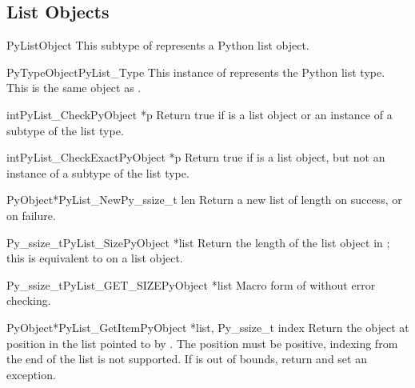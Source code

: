 \subsection{List Objects \label{listObjects}}

\begin{ctypedesc}{PyListObject}
  This subtype of  represents a Python list object.
\end{ctypedesc}

\begin{cvardesc}{PyTypeObject}{PyList_Type}
  This instance of  represents the Python list
  type.  This is the same object as .
\end{cvardesc}

\begin{cfuncdesc}{int}{PyList_Check}{PyObject *p}
  Return true if  is a list object or an instance of a
  subtype of the list type.
\end{cfuncdesc}

\begin{cfuncdesc}{int}{PyList_CheckExact}{PyObject *p}
  Return true if  is a list object, but not an instance of a
  subtype of the list type.
\end{cfuncdesc}

\begin{cfuncdesc}{PyObject*}{PyList_New}{Py_ssize_t len}
  Return a new list of length  on success, or \NULL{} on
  failure.
\end{cfuncdesc}

\begin{cfuncdesc}{Py_ssize_t}{PyList_Size}{PyObject *list}
  Return the length of the list object in ; this is
  equivalent to  on a list object.
\end{cfuncdesc}

\begin{cfuncdesc}{Py_ssize_t}{PyList_GET_SIZE}{PyObject *list}
  Macro form of  without error checking.
\end{cfuncdesc}

\begin{cfuncdesc}{PyObject*}{PyList_GetItem}{PyObject *list, Py_ssize_t index}
  Return the object at position  in the list pointed to by
  .  The position must be positive, indexing from the end of the
  list is not supported.  If  is out of bounds, return \NULL{}
  and set an  exception.
\end{cfuncdesc}

